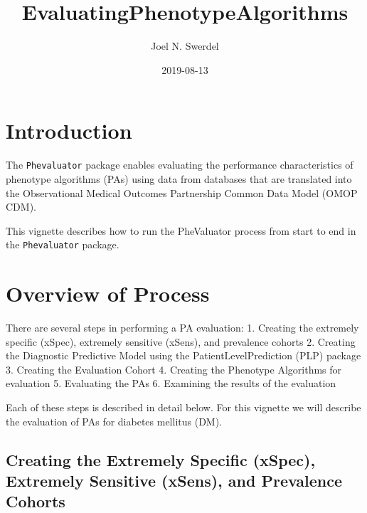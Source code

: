 \documentclass[]{article}
\title{EvaluatingPhenotypeAlgorithms}
\author{Joel N. Swerdel}
\date{2019-08-13}
\begin{document}
\maketitle

{
\setcounter{tocdepth}{3}
\tableofcontents
}
\newpage

\hypertarget{introduction}{%
\section{Introduction}\label{introduction}}

The \texttt{Phevaluator} package enables evaluating the performance
characteristics of phenotype algorithms (PAs) using data from databases
that are translated into the Observational Medical Outcomes Partnership
Common Data Model (OMOP CDM).

This vignette describes how to run the PheValuator process from start to
end in the \texttt{Phevaluator} package.

\hypertarget{overview-of-process}{%
\section{Overview of Process}\label{overview-of-process}}

There are several steps in performing a PA evaluation: 1. Creating the
extremely specific (xSpec), extremely sensitive (xSens), and prevalence
cohorts 2. Creating the Diagnostic Predictive Model using the
PatientLevelPrediction (PLP) package 3. Creating the Evaluation Cohort
4. Creating the Phenotype Algorithms for evaluation 5. Evaluating the
PAs 6. Examining the results of the evaluation

Each of these steps is described in detail below. For this vignette we
will describe the evaluation of PAs for diabetes mellitus (DM).

\hypertarget{creating-the-extremely-specific-xspec-extremely-sensitive-xsens-and-prevalence-cohorts}{%
\subsection{Creating the Extremely Specific (xSpec), Extremely Sensitive
(xSens), and Prevalence
Cohorts}\label{creating-the-extremely-specific-xspec-extremely-sensitive-xsens-and-prevalence-cohorts}}
\end{document}
